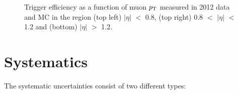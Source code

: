 \begin{figure}[h!]

\begin{center}
\end{center}
\caption{Trigger efficiency as a function of muon $p_{\mathrm{T}}$ measured in
2012 data and MC in the region (top left) $|\eta|$ $<$ 0.8, (top right) 0.8
$<$ $|\eta|$ $<$ 1.2 and (bottom) $|\eta|$ $>$ 1.2.}
\label{fig:muontrg}
\end{figure}

\section{Systematics}
\label{sec:systematics}

The systematic uncertainties consist of two different types:

